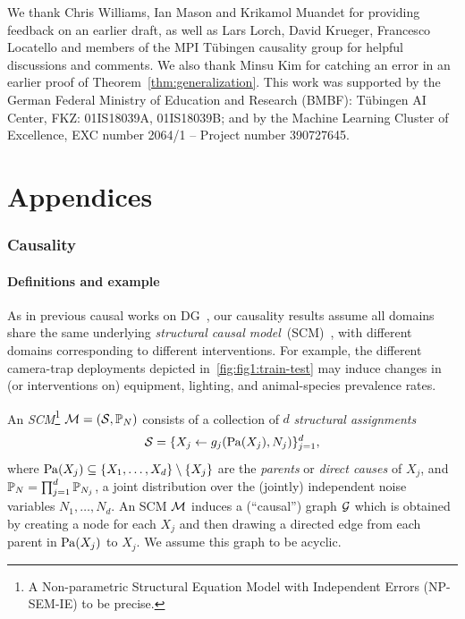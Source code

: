 \documentclass{article}
\begin{document}
%
%

\acksection\vspace{-2.5mm}
We thank Chris Williams, Ian Mason and Krikamol Muandet for providing feedback on an earlier draft, as well as Lars Lorch, David Krueger, Francesco Locatello and members of the MPI T\"ubingen causality group for helpful discussions and comments. We also thank Minsu Kim for catching an error in an earlier proof of Theorem~\ref{thm:generalization}.
This work was supported by the German Federal Ministry of Education and Research (BMBF): Tübingen AI Center, FKZ: 01IS18039A, 01IS18039B; and by the Machine Learning Cluster of Excellence, EXC number 2064/1 – Project number 390727645.



%

%
%
%

%

\newpage
\appendix

%
\part{Appendices} %
\parttoc%
\newpage
{}

\section{Causality}
\label{app:causality}

\subsection{Definitions and example}
\label{app:causality:defs}
As in previous causal works on DG~\citep{arjovsky2020invariant, krueger21rex, peters2016causal, christiansen2021causal, rojas2018invariant}, our causality results assume
%
all domains share the same underlying \textit{structural causal model}~(SCM)~\cite{pearl2009causality}, with different domains corresponding to different interventions.  For example, the different camera-trap deployments depicted in~\cref{fig:fig1:train-test} may induce changes in (or interventions on) equipment, lighting, and animal-species prevalence rates. 
%
%
%
%
%
\begin{definition}\upshape
An \emph{SCM}\footnote{A Non-parametric Structural Equation Model with Independent Errors (NP-SEM-IE) to be precise.
%
} $\mathcal{M} =(\mathcal{S}, \mathbb{P}_{N})$ consists of a collection of $d$ \emph{structural assignments}
%
\begin{equation}
\label{eq:scm-def}
    \mathcal{S}=\{ X_j \gets g_j(\mathrm{Pa}(X_j), N_j)\}_{j = 1}^d,
\end{equation}
where $\mathrm{Pa}(X_j) \subseteq \{X_1, \dots, X_d\} \setminus \{X_j\}$ are the \emph{parents} or \emph{direct causes} of $X_j$, and $\mathbb{P}_{N}=\prod_{j=1}^d \mathbb{P}_{N_j}$, a joint distribution over the (jointly) independent noise variables $N_1, \dots, N_d$. An SCM $\mathcal{M}$ induces a (``causal'') graph $\mathcal{G}$ which is obtained by creating a node for each $X_j$ and then drawing a directed edge from each parent in $\mathrm{Pa}(X_j)$ to $X_j$. We assume this graph to be acyclic.
\end{definition}
\end{document}
